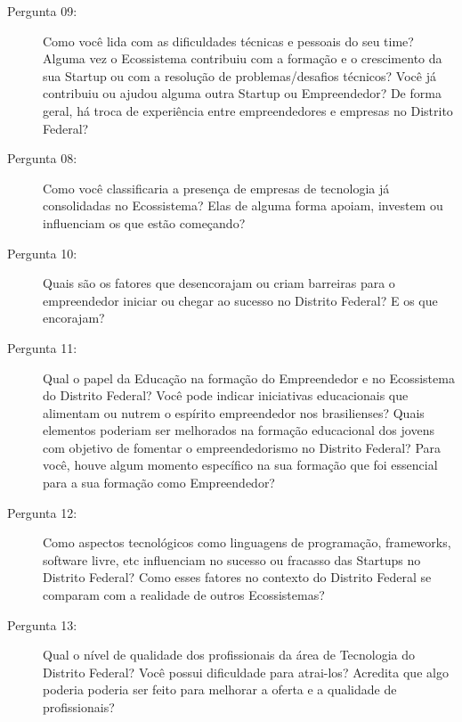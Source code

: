 \begin{description}
  \item [Pergunta 09:] Como você lida com as dificuldades técnicas e pessoais do seu time? Alguma vez o Ecossistema contribuiu com a formação e o crescimento da sua Startup ou com a resolução de problemas/desafios técnicos? Você já contribuiu ou ajudou alguma outra Startup ou Empreendedor? De forma geral, há troca de experiência entre empreendedores e empresas no Distrito Federal? 

  \item [Pergunta 08:] Como você classificaria a presença de empresas de tecnologia já consolidadas no Ecossistema? Elas de alguma forma apoiam, investem ou influenciam os que estão começando?  

  \item [Pergunta 10:] Quais são os fatores que desencorajam ou criam barreiras para o empreendedor iniciar ou chegar ao sucesso no Distrito Federal? E os que encorajam?


  \item [Pergunta 11:] Qual o papel da Educação na formação do Empreendedor e no Ecossistema do Distrito Federal? Você pode indicar iniciativas educacionais que alimentam ou nutrem o espírito empreendedor nos brasilienses? Quais elementos poderiam ser melhorados na formação educacional dos jovens com objetivo de fomentar o empreendedorismo no Distrito Federal? Para você, houve algum momento específico na sua formação que foi essencial para a sua formação como Empreendedor?


  \item [Pergunta 12:] Como aspectos tecnológicos como linguagens de programação, frameworks, software livre, etc influenciam no sucesso ou fracasso das Startups no Distrito Federal? Como esses fatores no contexto do Distrito Federal se comparam com a realidade de outros Ecossistemas? 

  \item [Pergunta 13:] Qual o nível de qualidade dos profissionais da área de Tecnologia do Distrito Federal? Você possui dificuldade para atrai-los? Acredita que algo poderia poderia ser feito para melhorar a oferta e a qualidade de profissionais?
  

\end{description}
